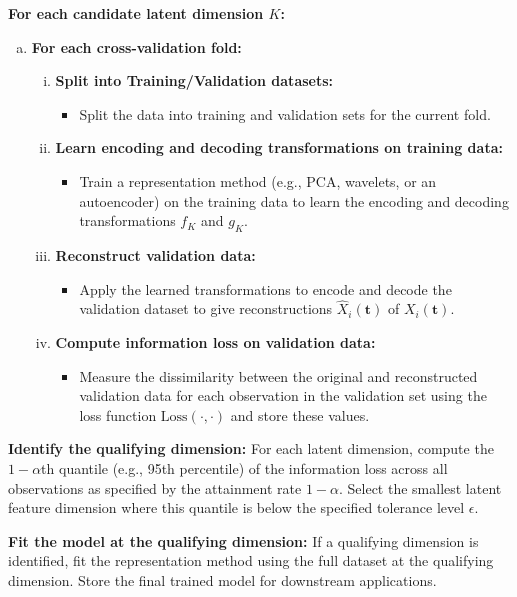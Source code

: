 \begin{algorithm}
\begin{algorithmic}[1]
\State \textbf{For each candidate latent dimension $K$:}
\begin{enumerate}[a.]
    \item \textbf{For each cross-validation fold:}
    \begin{enumerate}[i.]
        \item \textbf{Split into Training/Validation datasets:}
        \begin{itemize}
            \item Split the data into training and validation sets for the current fold.
        \end{itemize}
        \item \textbf{Learn encoding and decoding transformations on training data:}
        \begin{itemize}
            \item Train a representation method (e.g., PCA, wavelets, or an autoencoder) on the training data to learn the encoding and decoding transformations $f_K$ and $g_K$.
        \end{itemize}
        \item \textbf{Reconstruct validation data:}
        \begin{itemize}
            \item Apply the learned transformations to encode and decode the validation dataset to give reconstructions $\widehat{X}_i (\mathbf{t})$ of $X_i (\mathbf{t})$.
        \end{itemize}
        \item \textbf{Compute information loss on validation data:}
        \begin{itemize}
            \item Measure the dissimilarity between the original and reconstructed validation data for each observation in the validation set using the loss function $\text{Loss}(\cdot, \cdot)$ and store these values.
        \end{itemize}
    \end{enumerate}
\end{enumerate}

\State \textbf{Identify the qualifying dimension:} For each latent dimension, compute the $1 - \alpha$th quantile (e.g., 95th percentile) of the information loss across all observations as specified by the attainment rate $1 - \alpha$. Select the smallest latent feature dimension where this quantile is below the specified tolerance level $\epsilon$.

\State \textbf{Fit the model at the qualifying dimension:} If a qualifying dimension is identified, fit the representation method using the full dataset at the qualifying dimension. Store the final trained model for downstream applications.


\end{algorithmic}
\end{algorithm}
